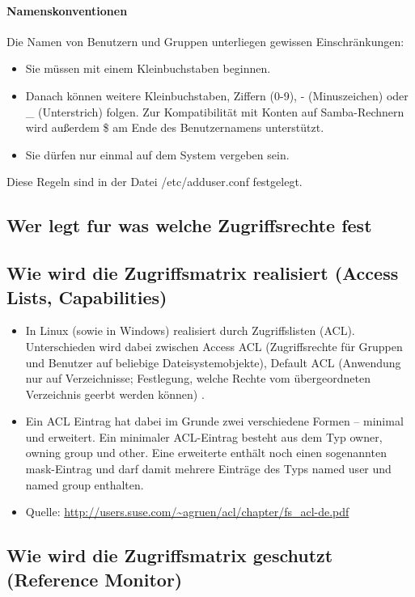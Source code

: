 \documentclass{scrartcl}
\begin{document}
\paragraph{Namenskonventionen}
Die Namen von Benutzern und Gruppen unterliegen gewissen Einschränkungen:
\begin{itemize}
  \item Sie müssen mit einem Kleinbuchstaben beginnen.
  \item Danach können weitere Kleinbuchstaben, Ziffern (0-9), - (Minuszeichen)
    oder _ (Unterstrich) folgen. Zur Kompatibilität mit Konten auf
    Samba-Rechnern wird außerdem \$ am Ende des Benutzernamens unterstützt.
  \item Sie dürfen nur einmal auf dem System vergeben sein.
\end{itemize}
Diese Regeln sind in der Datei /etc/adduser.conf festgelegt.

\subsection*{Wer legt fur was welche Zugriffsrechte fest}
\subsection*{Wie wird die Zugriffsmatrix realisiert (Access Lists, Capabilities)}

\begin{itemize}
  \item In Linux (sowie in Windows) realisiert durch Zugriffslisten (ACL). Unterschieden wird 
  dabei zwischen Access ACL (Zugriffsrechte für Gruppen und Benutzer auf beliebige Dateisystemobjekte), 
  Default ACL (Anwendung nur auf Verzeichnisse; Festlegung, welche Rechte vom übergeordneten
  Verzeichnis geerbt werden können) .
  \item Ein ACL Eintrag hat dabei im Grunde zwei verschiedene Formen – minimal und erweitert. Ein 
  minimaler ACL-Eintrag besteht aus dem Typ owner, owning group und other. Eine erweiterte enthält 
  noch einen sogenannten mask-Eintrag und darf damit mehrere Einträge des Typs named user und named 
  group enthalten.
  \item Quelle: \url{http://users.suse.com/~agruen/acl/chapter/fs_acl-de.pdf}
\end{itemize}

\subsection*{Wie wird die Zugriffsmatrix geschutzt (Reference Monitor)}
\end{document}
